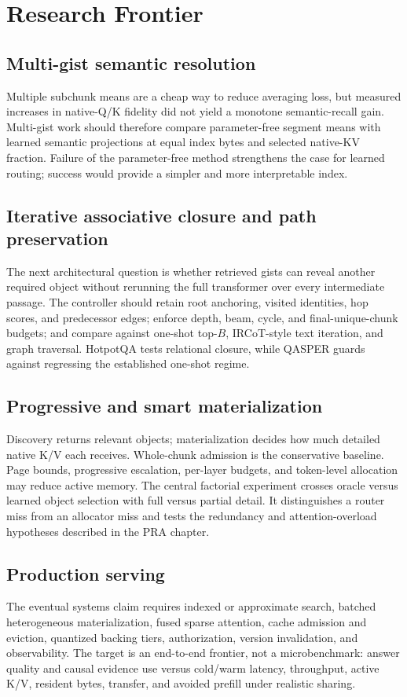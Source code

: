 \documentclass[10pt,a4paper]{article}
\begin{document}
\section{Research Frontier}

\subsection{Multi-gist semantic resolution}
Multiple subchunk means are a cheap way to reduce averaging loss, but measured increases in
native-Q/K fidelity did not yield a monotone semantic-recall gain. Multi-gist work should
therefore compare parameter-free segment means with learned semantic projections at equal
index bytes and selected native-KV fraction. Failure of the parameter-free method strengthens
the case for learned routing; success would provide a simpler and more interpretable index.

\subsection{Iterative associative closure and path preservation}
The next architectural question is whether retrieved gists can reveal another required object
without rerunning the full transformer over every intermediate passage. The controller should
retain root anchoring, visited identities, hop scores, and predecessor edges; enforce depth,
beam, cycle, and final-unique-chunk budgets; and compare against one-shot top-$B$, IRCoT-style
text iteration, and graph traversal. HotpotQA tests relational closure, while QASPER guards
against regressing the established one-shot regime.

\subsection{Progressive and smart materialization}
Discovery returns relevant objects; materialization decides how much detailed native K/V each
receives. Whole-chunk admission is the conservative baseline. Page bounds, progressive
escalation, per-layer budgets, and token-level allocation may reduce active memory. The central
factorial experiment crosses oracle versus learned object selection with full versus partial
detail. It distinguishes a router miss from an allocator miss and tests the redundancy and
attention-overload hypotheses described in the PRA chapter.

\subsection{Production serving}
The eventual systems claim requires indexed or approximate search, batched heterogeneous
materialization, fused sparse attention, cache admission and eviction, quantized backing tiers,
authorization, version invalidation, and observability. The target is an end-to-end frontier,
not a microbenchmark: answer quality and causal evidence use versus cold/warm latency,
throughput, active K/V, resident bytes, transfer, and avoided prefill under realistic sharing.
\end{document}
